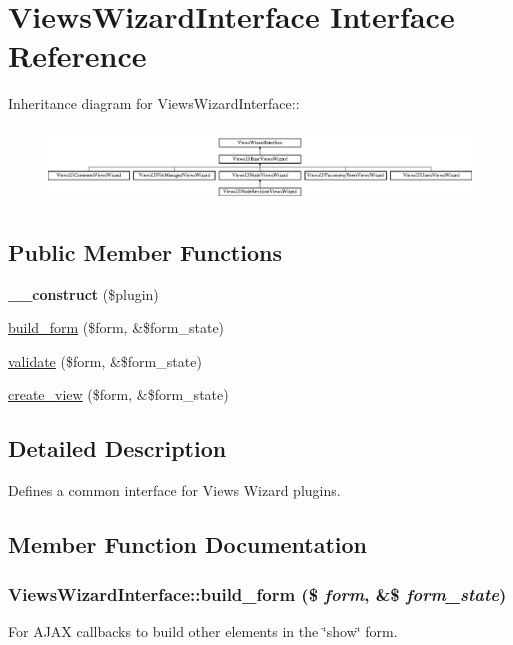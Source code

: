 \hypertarget{interfaceViewsWizardInterface}{
\section{ViewsWizardInterface Interface Reference}
\label{interfaceViewsWizardInterface}
}
Inheritance diagram for ViewsWizardInterface::\begin{figure}[H]
\begin{center}
\leavevmode
\includegraphics[height=2.00897cm]{interfaceViewsWizardInterface}
\end{center}
\end{figure}
\subsection*{Public Member Functions}
\begin{DoxyCompactItemize}
\item 
\hypertarget{interfaceViewsWizardInterface_a2026ccc52816ad35531642e6845cba7b}{
{\bfseries \_\-\_\-construct} (\$plugin)}
\label{interfaceViewsWizardInterface_a2026ccc52816ad35531642e6845cba7b}

\item 
\hyperlink{interfaceViewsWizardInterface_a9ae787c3f3e1d59fb1850c491ff24bcb}{build\_\-form} (\$form, \&\$form\_\-state)
\item 
\hyperlink{interfaceViewsWizardInterface_af5be7d965ec92b27da1eb1a01f5bfc61}{validate} (\$form, \&\$form\_\-state)
\item 
\hyperlink{interfaceViewsWizardInterface_a29dcb9af9b511509bba69e55b643edc0}{create\_\-view} (\$form, \&\$form\_\-state)
\end{DoxyCompactItemize}


\subsection{Detailed Description}
Defines a common interface for Views Wizard plugins. 

\subsection{Member Function Documentation}
\hypertarget{interfaceViewsWizardInterface_a9ae787c3f3e1d59fb1850c491ff24bcb}{
\subsubsection[{build\_\-form}]{\setlength{\rightskip}{0pt plus 5cm}ViewsWizardInterface::build\_\-form (\$ {\em form}, \/  \&\$ {\em form\_\-state})}}
\label{interfaceViewsWizardInterface_a9ae787c3f3e1d59fb1850c491ff24bcb}
For AJAX callbacks to build other elements in the \char`\"{}show\char`\"{} form. 

